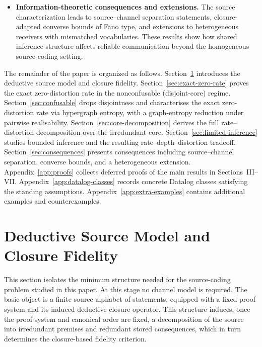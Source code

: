 \documentclass[journal,onecolumn]{IEEEtran}
\numberwithin{equation}{section}
\begin{document}
\begin{itemize}
\item \textbf{Information-theoretic consequences and extensions.}
The source characterization leads to source--channel separation statements, closure-adapted converse bounds of Fano type, and extensions to heterogeneous receivers with mismatched vocabularies. These results show how shared inference structure affects reliable communication beyond the homogeneous source-coding setting.

\end{itemize}

The remainder of the paper is organized as follows.
Section~\ref{sec:deductive-source} introduces the deductive source
model and closure fidelity.
Section~\ref{sec:exact-zero-rate} proves the exact zero-distortion
rate in the nonconfusable (disjoint-core) regime.
Section~\ref{sec:confusable} drops disjointness and characterises the
exact zero-distortion rate via hypergraph entropy, with a graph-entropy
reduction under pairwise realisability.
Section~\ref{sec:core-decomposition} derives the full
rate--distortion decomposition over the irredundant core.
Section~\ref{sec:limited-inference} studies bounded inference and
the resulting rate--depth--distortion tradeoff.
Section~\ref{sec:consequences} presents consequences including
source--channel separation, converse bounds, and a heterogeneous
extension.
Appendix~\ref{app:proofs} collects deferred proofs of the main
results in Sections~III--VII.
Appendix~\ref{app:datalog-classes} records concrete Datalog
classes satisfying the standing assumptions.
Appendix~\ref{app:extra-examples} contains additional examples and
counterexamples.

\section{Deductive Source Model and Closure Fidelity}
\label{sec:deductive-source}

This section isolates the minimum structure needed for the
source-coding problem studied in this paper.
At this stage no channel model is required.
The basic object is a finite source alphabet of statements,
equipped with a fixed proof system and its induced deductive
closure operator.
This structure induces, once the proof system and canonical order are
fixed, a decomposition of the source into irredundant premises and
redundant stored consequences, which in turn determines the
closure-based fidelity criterion.
\end{document}
